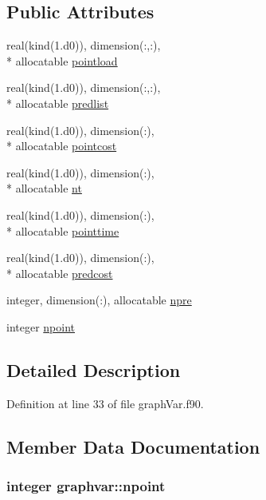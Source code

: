 \subsection*{Public Attributes}
\begin{DoxyCompactItemize}
\item 
real(kind(1.d0)), dimension(\-:,\-:), \\*
allocatable \hyperlink{classgraphvar_a1954093c5fbabd93e5fe7edd2a31d832}{pointload}
\item 
real(kind(1.d0)), dimension(\-:,\-:), \\*
allocatable \hyperlink{classgraphvar_a8753856c2f5a52fc08eb6921a26bc1d8}{predlist}
\item 
real(kind(1.d0)), dimension(\-:), \\*
allocatable \hyperlink{classgraphvar_ac970f8c36514c71b7a853e40044adb0d}{pointcost}
\item 
real(kind(1.d0)), dimension(\-:), \\*
allocatable \hyperlink{classgraphvar_a7a5f6e8feb558a58e3da62a98f82460d}{nt}
\item 
real(kind(1.d0)), dimension(\-:), \\*
allocatable \hyperlink{classgraphvar_a86e3f05c7a1e138ae02e9fb054265283}{pointtime}
\item 
real(kind(1.d0)), dimension(\-:), \\*
allocatable \hyperlink{classgraphvar_ade6890fe2822d19eea989655d35af2b9}{predcost}
\item 
integer, dimension(\-:), allocatable \hyperlink{classgraphvar_ac32e47ccf07b072eeafcec3b9e88d796}{npre}
\item 
integer \hyperlink{classgraphvar_a384a2e398a5d46994a4dbbc3edc4b21a}{npoint}
\end{DoxyCompactItemize}


\subsection{Detailed Description}


Definition at line 33 of file graph\-Var.\-f90.



\subsection{Member Data Documentation}
\hypertarget{classgraphvar_a384a2e398a5d46994a4dbbc3edc4b21a}{
\subsubsection[{npoint}]{\setlength{\rightskip}{0pt plus 5cm}integer graphvar\-::npoint}}\label{classgraphvar_a384a2e398a5d46994a4dbbc3edc4b21a}



